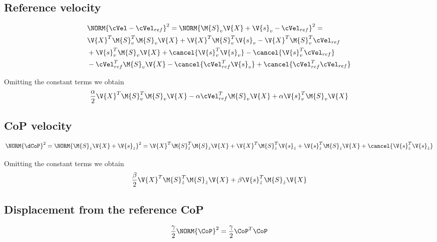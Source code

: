 \subsection{Reference velocity}
\begin{equation}
\begin{split}
    &\NORM{\cVel - \cVel_{ref}}^2
    =
    \NORM{\M{S}_v \V{X} + \V{s}_v   -  \cVel_{ref}}^ 2
    = \\
    &
    \V{X}^T \M{S}_v^T \M{S}_v \V{X}
    +
    \V{X}^T \M{S}_v^T \V{s}_v
    -
    \V{X}^T \M{S}_v^T \cVel_{ref}\\
    &
    +
    \V{s}_v^T \M{S}_v \V{X}
    +
    \cancel{\V{s}_v^T \V{s}_v}
    -
    \cancel{\V{s}_v^T \cVel_{ref}} \\
    &
    -
    \cVel_{ref}^T \M{S}_v \V{X}
    -
    \cancel{\cVel_{ref}^T \V{s}_v}
    +
    \cancel{\cVel_{ref}^T \cVel_{ref}}
\end{split}
\end{equation}

Omitting the  constant terms we obtain
\begin{equation}
    \frac{\alpha}{2} \V{X}^T \M{S}_v^T \M{S}_v \V{X}
    -
    \alpha \cVel_{ref}^T \M{S}_v \V{X}
    +
    \alpha \V{s}^T_v \M{S}_v \V{X}
\end{equation}

\subsection{CoP velocity}
\begin{equation}
    \NORM{\dCoP}^2 =
    \NORM{\M{S}_{\dot{z}} \V{X} + \V{s}_{\dot{z}}}^2 =
        \V{X}^T \M{S}_{\dot{z}}^T \M{S}_{\dot{z}} \V{X}
        +
        \V{X}^T \M{S}_{\dot{z}}^T \V{s}_{\dot{z}}
        +
        \V{s}_{\dot{z}}^T \M{S}_{\dot{z}} \V{X}
        +
        \cancel{\V{s}_{\dot{z}}^T \V{s}_{\dot{z}}}
\end{equation}

Omitting the constant terms we obtain
\begin{equation}
    \frac{\beta}{2}
    \V{X}^T \M{S}_{\dot{z}}^T \M{S}_{\dot{z}} \V{X}
    +
    \beta
    \V{s}_{\dot{z}}^T \M{S}_{\dot{z}} \V{X}
\end{equation}

\subsection{Displacement from the reference CoP}
\begin{equation}
    \frac{\gamma}{2} \NORM{\CoP}^2
        = \frac{\gamma}{2} \CoP^T \CoP
\end{equation}



